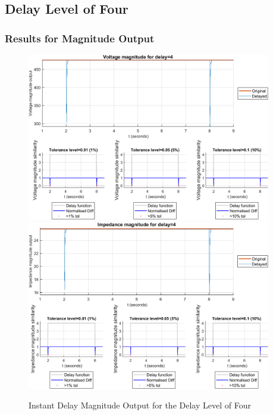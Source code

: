\subsection{Delay Level of Four}
\subsubsection{Results for Magnitude Output}

\begin{figure}
    \caption{Instant Delay Magnitude Output for the Delay Level of Four}
    \includegraphics[width=0.95\textwidth]{PMUsim-figures/DelayOf_4/Instant_vMagnitude.png}    
      \includegraphics[width=0.95\textwidth]{PMUsim-figures/DelayOf_4/Instant_iMagnitude.png}         \label{fig:PMUsim_Four_Magnitude}
    \begin{small}
     \end{small}
\end{figure}

